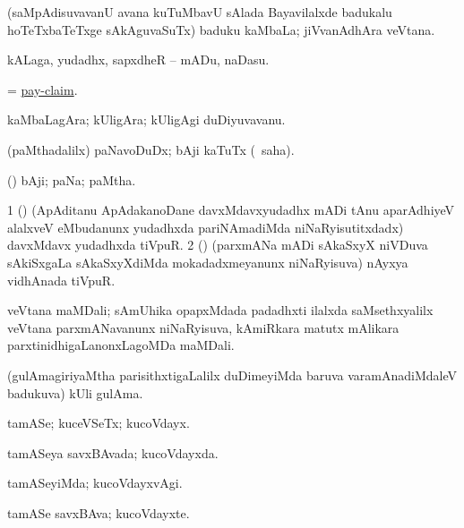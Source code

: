 \noindent 
\gl{\pagu}
\expl{}
\bmng
{} (saMpAdisuvavanU avana kuTuMbavU sAlada Bayavilalxde badukalu hoTeTxbaTeTxge sAkAguvaSuTx) baduku kaMbaLa; jiVvanAdhAra veVtana. 
\emng
\eentry

\bentry
{} 
\gl{\sakirx}
\expl{}
\bmng
kALaga, yudadhx, sapxdheR -- mADu, naDasu. 
\emng
\eentry

\bentry
{} 
\gl{\nA}
\expl{}
\bmng
= \hyperref{kandict_p.pdf}{P}{pay-claim}{pay-claim}. 
\emng
\eentry

\bentry
{} 
\gl{\nA}
\expl{}
\bmng
kaMbaLagAra; kUligAra; kUligAgi duDiyuvavanu. 
\emng
\eentry

\bentry
{} 
\gl{\sakirx}
\expl{}
\bmng
(paMthadalilx) paNavoDuDx; bAji kaTuTx (\akirx\ saha). 
\emng
\eentry

\bentry
{} 
\gl{\nA}
\expl{}
\bmng
(\ca) bAji; paNa; paMtha. 
\emng

\noindent 
\gl{\pagu}
\bmng
\bnum
\num{1}  (\ca) (ApAditanu ApAdakanoDane davxMdavxyudadhx mADi tAnu aparAdhiyeV alalxveV eMbudanunx yudadhxda pariNAmadiMda niNaRyisutitxdadx) davxMdavx yudadhxda tiVpuR. 
\num{2}  (\ca) (parxmANa mADi sAkaSxyX niVDuva sAkiSxgaLa sAkaSxyXdiMda mokadadxmeyanunx niNaRyisuva) nAyxya vidhAnada tiVpuR. 
\enum
\emng
\eentry

\bentry
{}
\gl{\nA}
\expl{}
\bmng
veVtana maMDali; sAmUhika opapxMdada padadhxti ilalxda saMsethxyalilx veVtana parxmANavanunx niNaRyisuva, kAmiRkara matutx mAlikara parxtinidhigaLanonxLagoMDa maMDali. 
\emng
\eentry

\bentry
{}
\gl{\nA}
\expl{}
\bmng
(gulAmagiriyaMtha parisithxtigaLalilx duDimeyiMda baruva varamAnadiMdaleV badukuva) kUli gulAma. 
\emng
\eentry

\bentry
{} 
\gl{\nA}
\bmng
 tamASe; kuceVSeTx; kucoVdayx. 
\emng
\eentry

\bentry
{} 
\gl{\gu}
\expl{}
\bmng
tamASeya savxBAvada; kucoVdayxda. 
\emng
\eentry

\bentry
{} 
\gl{\kirxvi}
\expl{}
\bmng
tamASeyiMda; kucoVdayxvAgi. 
\emng
\eentry

\bentry
{} 
\gl{\nA}
\expl{}
\bmng
tamASe savxBAva; kucoVdayxte. 
\emng
\eentry

